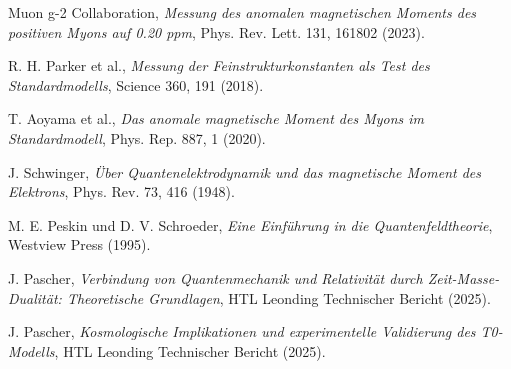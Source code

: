 \documentclass[12pt,a4paper]{article}
\begin{document}
	\begin{thebibliography}{99}
		Muon g-2 Collaboration,
		\textit{Messung des anomalen magnetischen Moments des positiven Myons auf 0.20 ppm},
		Phys. Rev. Lett. 131, 161802 (2023).
		
		R. H. Parker et al.,
		\textit{Messung der Feinstrukturkonstanten als Test des Standardmodells},
		Science 360, 191 (2018).
		
		T. Aoyama et al.,
		\textit{Das anomale magnetische Moment des Myons im Standardmodell},
		Phys. Rep. 887, 1 (2020).
		
		J. Schwinger,
		\textit{Über Quantenelektrodynamik und das magnetische Moment des Elektrons},
		Phys. Rev. 73, 416 (1948).
		
		M. E. Peskin und D. V. Schroeder,
		\textit{Eine Einführung in die Quantenfeldtheorie},
		Westview Press (1995).
		
		J. Pascher,
		\textit{Verbindung von Quantenmechanik und Relativität durch Zeit-Masse-Dualität: Theoretische Grundlagen},
		HTL Leonding Technischer Bericht (2025).
		
		J. Pascher,
		\textit{Kosmologische Implikationen und experimentelle Validierung des T0-Modells},
		HTL Leonding Technischer Bericht (2025).
	\end{thebibliography}
	
\end{document}
